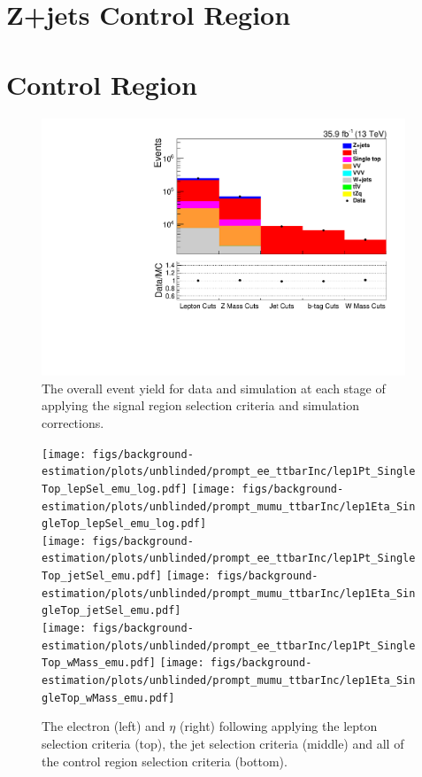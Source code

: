 \section{Z+jets Control Region}\label{appSec:signalRegionPlots}

\section{\ttbar Control Region}\label{appSec:signalRegionPlots}

\begin{figure}[h]
\centering
\includegraphics[width=0.97\textwidth]{figs/background-estimation/plots/unblinded/ttbar_control/cutFlow_log.pdf}
\caption{
The overall event yield for data and simulation at each stage of applying the signal region selection criteria and simulation corrections.
}
\label{fig:ttbar_cutFlow}
\end{figure}

\begin{figure}[h]
\centering
\texttt{[image: figs/background-estimation/plots/unblinded/prompt\_ee\_ttbarInc/lep1Pt\_SingleTop\_lepSel\_emu\_log.pdf]}
\texttt{[image: figs/background-estimation/plots/unblinded/prompt\_mumu\_ttbarInc/lep1Eta\_SingleTop\_lepSel\_emu\_log.pdf]}
\\
\texttt{[image: figs/background-estimation/plots/unblinded/prompt\_ee\_ttbarInc/lep1Pt\_SingleTop\_jetSel\_emu.pdf]}
\texttt{[image: figs/background-estimation/plots/unblinded/prompt\_mumu\_ttbarInc/lep1Eta\_SingleTop\_jetSel\_emu.pdf]}
\\
\texttt{[image: figs/background-estimation/plots/unblinded/prompt\_ee\_ttbarInc/lep1Pt\_SingleTop\_wMass\_emu.pdf]}
\texttt{[image: figs/background-estimation/plots/unblinded/prompt\_mumu\_ttbarInc/lep1Eta\_SingleTop\_wMass\_emu.pdf]}
\caption{
The electron \pT (left) and $\eta$ (right) following applying the lepton selection criteria (top), the jet selection criteria (middle) and all of the \ttbar control region selection criteria (bottom).
}
\label{fig:ttbar_electron}
\end{figure}

